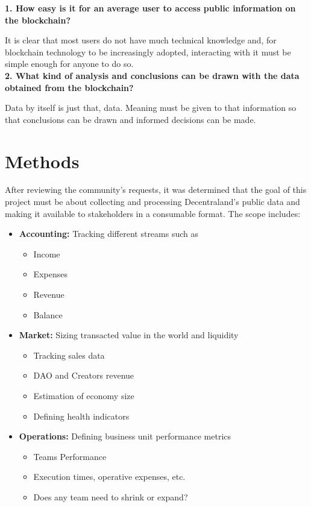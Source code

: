 \documentclass[MSE,Master,english]{twbook}%
\begin{document}
\textbf{1. How easy is it for an average user to access public information on the blockchain?}

It is clear that most users do not have much technical knowledge and, for blockchain technology to be increasingly adopted, interacting with it must be simple enough for anyone to do so. \\

\textbf{2. What kind of analysis and conclusions can be drawn with the data obtained from the blockchain?}

Data by itself is just that, data. Meaning must be given to that information so that conclusions can be drawn and informed decisions can be made.

\section{Methods\label{methods}}
After reviewing the community's requests, it was determined that the goal of this project must be about collecting and processing Decentraland's public data and making it available to stakeholders in a consumable format. The scope includes:

\begin{itemize}
  \item \textbf{Accounting:} Tracking different streams such as
  \begin{itemize}
    \item Income
    \item Expenses
    \item Revenue
    \item Balance
  \end{itemize}
  \item \textbf{Market:} Sizing transacted value in the world and liquidity
  \begin{itemize}
    \item Tracking sales data
    \item DAO and Creators revenue
    \item Estimation of economy size
    \item Defining health indicators
  \end{itemize}
  \item \textbf{Operations:} Defining business unit performance metrics
  \begin{itemize}
    \item Teams Performance
    \item Execution times, operative expenses, etc.
    \item Does any team need to shrink or expand?
  \end{itemize}
\end{itemize}
\end{document}
